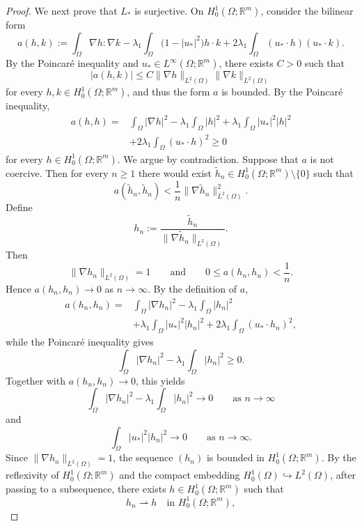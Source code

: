 \documentclass[11pt]{amsart}
\theoremstyle{definition}
\theoremstyle{plain}
\newcommand{\abs}[1]{\lvert#1\rvert}
\newcommand{\norm}[1]{\lVert#1\rVert}
\newcommand{\R}{\mathbb{R}}
\numberwithin{equation}{section}
\begin{document}
\begin{proof}
	We next prove that $L_*$ is surjective. On
	$H_0^1(\Omega;\R^m)$, consider the bilinear form
	\[
	a(h,k)
	:=
	\int_\Omega
	\nabla h:\nabla k
	-\lambda_1\int_\Omega
	\bigl(1-\abs{u_*}^2\bigr)h\cdot k
	+2\lambda_1\int_\Omega
	(u_*\cdot h)(u_*\cdot k).
	\]
	By the Poincaré inequality and
	$u_*\in L^\infty(\Omega;\R^m)$, there exists $C>0$ such that
	\[
	\abs{a(h,k)}
	\leq
	C
	\norm{\nabla h}_{L^2(\Omega)}
	\norm{\nabla k}_{L^2(\Omega)}
	\]
	for every $h,k\in H_0^1(\Omega;\R^m)$, and thus the form $a$ is
	bounded. By the Poincar\'e inequality,
	\[
		\begin{aligned}
		a(h,h)
		={}&
		\int_\Omega\abs{\nabla h}^2
		-\lambda_1\int_\Omega\abs{h}^2
		+\lambda_1\int_\Omega\abs{u_*}^2\abs{h}^2\\
		&+
		2\lambda_1\int_\Omega(u_*\cdot h)^2
		\geq0
		\end{aligned}\]
	for every $h\in H_0^1(\Omega;\R^m)$.
	We argue by contradiction. Suppose that $a$ is not coercive. Then for
	every $n\geq1$ there would exist
	$\widetilde{h}_n\in H_0^1(\Omega;\R^m)\setminus\{0\}$ such that
	\[
	a(\widetilde{h}_n,\widetilde{h}_n)
	<
	\frac{1}{n}
	\norm{\nabla\widetilde{h}_n}_{L^2(\Omega)}^2.
	\]
	Define
	\[
	h_n
	:=
	\frac{\widetilde{h}_n}
	{\norm{\nabla\widetilde{h}_n}_{L^2(\Omega)}}.
	\]
	Then
	\[
	\norm{\nabla h_n}_{L^2(\Omega)}=1
	\qquad\text{and}\qquad
	0\leq a(h_n,h_n)<\frac{1}{n}.
	\]
	Hence $a(h_n,h_n)\to0$ as $n\to\infty$.
	By the definition of $a$,
	\begin{align*}
		a(h_n,h_n)
		={}&
		\int_\Omega\abs{\nabla h_n}^2
		-\lambda_1\int_\Omega\abs{h_n}^2\\
		&+
		\lambda_1\int_\Omega
		\abs{u_*}^2\abs{h_n}^2
		+
		2\lambda_1\int_\Omega
		(u_*\cdot h_n)^2,
	\end{align*}
	while the Poincar\'e inequality gives
	\[
	\int_\Omega\abs{\nabla h_n}^2
	-\lambda_1\int_\Omega\abs{h_n}^2
	\geq0.
	\]
	Together with $a(h_n,h_n)\to0$, this yields
	\[
	\int_\Omega\abs{\nabla h_n}^2
	-\lambda_1\int_\Omega\abs{h_n}^2
	\to0
	\qquad\text{as }n\to\infty
	\]
	and
	\[
	\int_\Omega\abs{u_*}^2\abs{h_n}^2
	\to0
	\qquad\text{as }n\to\infty.
	\]
	Since $\norm{\nabla h_n}_{L^2(\Omega)}=1$, the sequence
	$(h_n)$ is bounded in $H_0^1(\Omega;\R^m)$. By the reflexivity of
	$H_0^1(\Omega;\R^m)$ and the compact embedding
	$H_0^1(\Omega)\hookrightarrow L^2(\Omega)$, after passing to a
	subsequence, there exists $h\in H_0^1(\Omega;\R^m)$ such that
	\begin{equation}\label{eq:coercivity-convergence}
	h_n\rightharpoonup h
	\quad\text{in }H_0^1(\Omega;\R^m),

\end{equation}
\end{proof}
\end{document}
